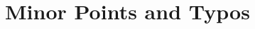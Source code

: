 \documentclass[12pt,english]{scrartcl}
\begin{document}
\section{Minor Points and Typos}
% 
% 
% 
% 
% 
% 
% 
% 
% 
% 
% 
% 
% 
% 
% 
% 
% 
% 
% 
% 
% 
% 
% 
% 

% 
% 
\end{document}
